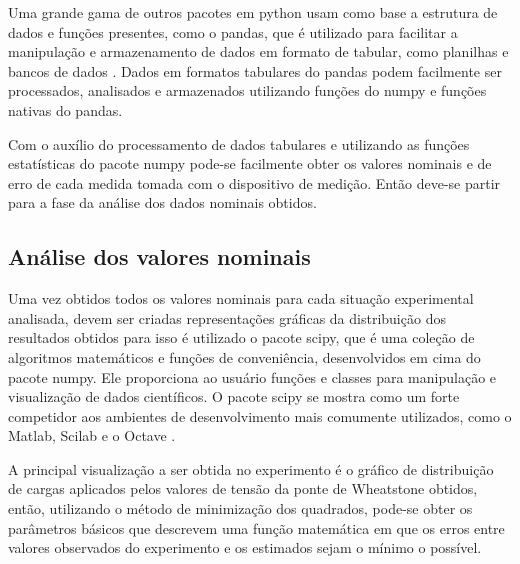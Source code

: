 Uma grande gama de outros pacotes em python usam como base a estrutura de dados e funções presentes, como o pandas, que é utilizado para facilitar a manipulação e
armazenamento de dados em formato de tabular, como planilhas e bancos de dados \autocite{DocsPandas}. Dados em formatos tabulares do pandas podem facilmente ser processados,
analisados e armazenados utilizando funções do numpy e funções nativas do pandas.

Com o auxílio do processamento de dados tabulares e utilizando as funções estatísticas do pacote numpy pode-se facilmente obter os valores nominais e de erro de cada medida
tomada com o dispositivo de medição. Então deve-se partir para a fase da análise dos dados nominais obtidos.

\subsection{Análise dos valores nominais}

Uma vez obtidos todos os valores nominais para cada situação experimental analisada, devem ser criadas representações gráficas da distribuição dos resultados obtidos para
isso é utilizado o pacote scipy, que é uma coleção de algoritmos matemáticos e funções de conveniência, desenvolvidos em cima do pacote numpy. Ele proporciona ao usuário
funções e classes para manipulação e visualização de dados científicos. O pacote scipy se mostra como um forte competidor aos ambientes de desenvolvimento mais comumente
utilizados, como o Matlab, Scilab e o Octave \autocite{DocsSciPy}.

A principal visualização a ser obtida no experimento é o gráfico de distribuição de cargas aplicados pelos valores de tensão da ponte de Wheatstone obtidos, então, utilizando
o método de minimização dos quadrados, pode-se obter os parâmetros básicos que descrevem uma função matemática em que os erros entre valores observados do experimento e os
estimados sejam o mínimo o possível.

